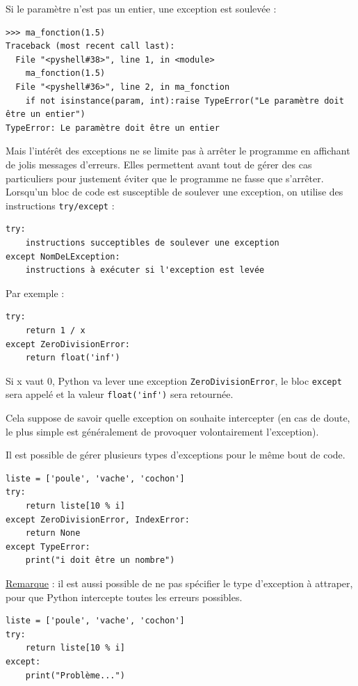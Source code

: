 \documentclass[12pt, a4paper]{article}
\begin{document}
Si le paramètre n'est pas un entier, une exception est soulevée :
\begin{lstlisting}
>>> ma_fonction(1.5)
Traceback (most recent call last):
  File "<pyshell#38>", line 1, in <module>
    ma_fonction(1.5)
  File "<pyshell#36>", line 2, in ma_fonction
    if not isinstance(param, int):raise TypeError("Le paramètre doit être un entier")
TypeError: Le paramètre doit être un entier
\end{lstlisting}

Mais l'intérêt des exceptions ne se limite pas à arrêter le programme en affichant de jolis messages d'erreurs. Elles permettent avant tout de gérer des cas particuliers pour justement éviter que le programme ne fasse que s'arrêter. Lorsqu'un bloc de code est susceptible de soulever une exception, on utilise des instructions \lstinline{try/except} :
\begin{lstlisting}
try:
    instructions succeptibles de soulever une exception
except NomDeLException:
    instructions à exécuter si l'exception est levée
\end{lstlisting}

Par exemple :
\begin{lstlisting}
try:
    return 1 / x
except ZeroDivisionError:
    return float('inf')
\end{lstlisting}

Si x vaut 0, Python va lever une exception \lstinline{ZeroDivisionError}, le bloc \lstinline{except} sera appelé et la valeur \lstinline{float('inf')} sera retournée.

Cela suppose de savoir quelle exception on souhaite intercepter (en cas de doute, le plus simple est généralement de provoquer volontairement l'exception).

Il est possible de gérer plusieurs types d'exceptions pour le même bout de code.
\begin{lstlisting}
liste = ['poule', 'vache', 'cochon']
try:
    return liste[10 % i]
except ZeroDivisionError, IndexError:
    return None
except TypeError:
    print("i doit être un nombre")
\end{lstlisting}

\underline{Remarque} : il est aussi possible de ne pas spécifier le type d'exception à attraper, pour que Python intercepte toutes les erreurs possibles.
\begin{lstlisting}
liste = ['poule', 'vache', 'cochon']
try:
    return liste[10 % i]
except:
    print("Problème...")
\end{lstlisting}
\end{document}
